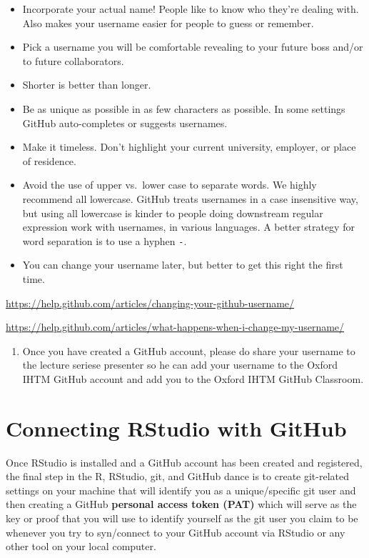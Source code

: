 \documentclass[
  12pt,
]{book}
\providecommand{\tightlist}{%
  \setlength{\itemsep}{0pt}\setlength{\parskip}{0pt}}
\begin{document}
\begin{itemize}
\item
  Incorporate your actual name! People like to know who they're dealing with. Also makes your username easier for people to guess or remember.
\item
  Pick a username you will be comfortable revealing to your future boss and/or to future collaborators.
\item
  Shorter is better than longer.
\item
  Be as unique as possible in as few characters as possible. In some settings GitHub auto-completes or suggests usernames.
\item
  Make it timeless. Don't highlight your current university, employer, or place of residence.
\item
  Avoid the use of upper vs.~lower case to separate words. We highly recommend all lowercase. GitHub treats usernames in a case insensitive way, but using all lowercase is kinder to people doing downstream regular expression work with usernames, in various languages. A better strategy for word separation is to use a hyphen \texttt{-}.
\item
  You can change your username later, but better to get this right the first time.
\end{itemize}

\url{https://help.github.com/articles/changing-your-github-username/}

\url{https://help.github.com/articles/what-happens-when-i-change-my-username/}

\begin{enumerate}
\def\labelenumi{\arabic{enumi}.}
\setcounter{enumi}{5}
\tightlist
\item
  Once you have created a GitHub account, please do share your username to the lecture seriese presenter so he can add your username to the Oxford IHTM GitHub account and add you to the Oxford IHTM GitHub Classroom.
\end{enumerate}

\hypertarget{connect-rstudio-github}{%
\chapter{Connecting RStudio with GitHub}\label{connect-rstudio-github}}

Once RStudio is installed and a GitHub account has been created and registered, the final step in the R, RStudio, git, and GitHub dance is to create git-related settings on your machine that will identify you as a unique/specific git user and then creating a GitHub \textbf{personal access token (PAT)} which will serve as the key or proof that you will use to identify yourself as the git user you claim to be whenever you try to syn/connect to your GitHub account via RStudio or any other tool on your local computer.
\end{document}
